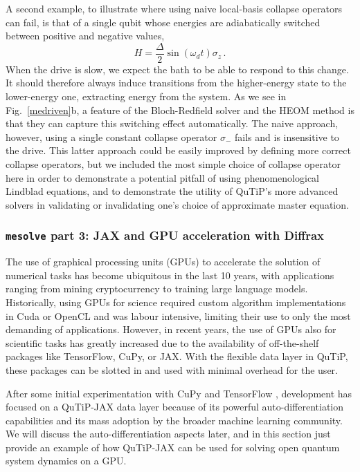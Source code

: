 \documentclass[preprint,3p,sort&compress]{elsarticle}
\def\code#1{\texttt{#1}}
\newcommand{\fig}[1]{Fig.~\ref{#1}}
\begin{document}
A second example, to illustrate where using naive local-basis collapse operators can fail, is that of a single qubit whose energies are adiabatically switched between positive and negative values,
\begin{equation}
H = \frac{\Delta}{2} \sin(\omega_d t) \sigma_z \, .
\end{equation}
 When the drive is slow, we expect the bath to be able to respond to this change. It should therefore always induce transitions from the higher-energy state to the lower-energy one, extracting energy from the system. As we see in \fig{medriven}b, a feature of the Bloch-Redfield solver and the HEOM method is that they can capture this switching effect automatically. The naive approach, however, using a single constant collapse operator $\sigma_-$ fails and is insensitive to the drive. This latter approach could be easily improved by defining more correct collapse operators, but we included the most simple choice of collapse operator here in order to demonstrate a potential pitfall of using phenomenological Lindblad equations, and to demonstrate the utility of QuTiP's more advanced solvers in validating or invalidating one's choice of approximate master equation.


\subsubsection{\textup{\code{mesolve}} part 3: JAX and GPU acceleration with Diffrax} \label{sec:me_jax_gpu}

The use of graphical processing units (GPUs) to accelerate the solution of numerical tasks has become ubiquitous in the last 10 years, with applications ranging from mining cryptocurrency to training large language models. Historically, using GPUs for science required custom algorithm implementations in Cuda or OpenCL and was labour intensive, limiting their use to only the most demanding of applications.  However, in recent years, the use of GPUs also for scientific tasks has greatly increased due to the availability of off-the-shelf packages like TensorFlow, CuPy, or JAX. With the flexible data layer in QuTiP, these packages can be slotted in and used with minimal overhead for the user. 

After some initial experimentation with CuPy \cite{cupy} and TensorFlow \cite{tflow}, development has focused on a QuTiP-JAX \cite{qjax} data layer because of its powerful auto-differentiation capabilities and its mass adoption by the broader machine learning community.  We will discuss the auto-differentiation aspects later, and in this section just provide an example of how QuTiP-JAX can be used for solving open quantum system dynamics on a GPU.  
\end{document}
